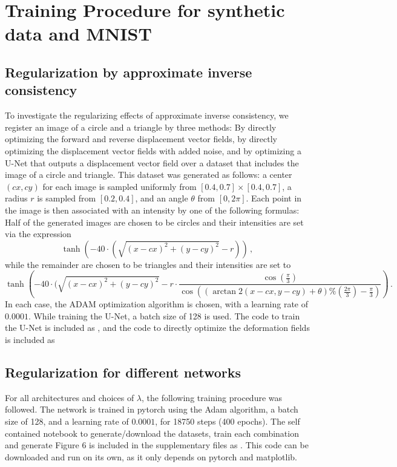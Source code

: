 \section{Training Procedure for synthetic data and MNIST}
\subsection{Regularization by approximate inverse consistency}
To investigate the regularizing effects of approximate inverse consistency, we register an image of a circle and a triangle by three methods: By directly optimizing the forward and reverse displacement vector fields, by directly optimizing the displacement vector fields with added noise, and by optimizing a U-Net that outputs a displacement vector field over a dataset that includes the image of a circle and triangle. This dataset was generated as follows: 
a center $(cx, cy)$ for each image is sampled uniformly from $[0.4, 0.7] \times [0.4, 0.7]$, a radius $r$ is sampled from $[0.2, 0.4]$, and an angle $\theta$ from $[0, 2 \pi]$. Each point in the image is then associated with an intensity by one of the following formulas:
Half of the generated images are chosen to be circles and their intensities are set via the expression
\begin{equation}
    \tanh\left(- 40 \cdot (\sqrt{(x - cx)^2 + (y - cy)^2} - r)\right) \,,
\end{equation}
while the remainder are chosen to be triangles and their intensities are set to
\begin{equation}
\tanh\left(-40 \cdot (\sqrt{(x - cx)^2 + (y - cy)^2}
    - r \cdot \frac{\cos(\frac{\pi}{3}) }{ \cos((\arctan2(x - cx, y - cy) + \theta) \% (\frac{2 \pi}{ 3}) - \frac{\pi}{ 3})}\right) \,.
\end{equation}
In each case, the ADAM optimization algorithm is chosen, with a learning rate of $0.0001$. While training the U-Net, a batch size of 128 is used. The code to train the U-Net is included as , and the code to directly optimize the deformation fields is included as 
\subsection{Regularization for different networks}
For all architectures and choices of $\lambda$, the following training procedure was followed. The network is trained in pytorch using the Adam algorithm, a batch size of 128, and a learning rate of $0.0001$, for 18750 steps (400 epochs). The self contained notebook to generate/download the datasets, train each combination and generate Figure 6 is included in the supplementary files as . This code can be downloaded and run on its own, as it only depends on pytorch and matplotlib.
